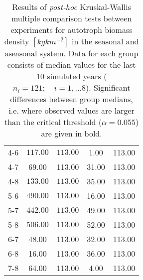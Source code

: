 \begin{table}[ht]
\begin{tabular*}{\textwidth}{@{\extracolsep{\fill} }ccccc}
  4-6 & \(\mathbf{117.00}\) & \(\mathbf{113.00}\) & 1.00 & 113.00 \\ 
  4-7 & 69.00 & 113.00 & 31.00 & 113.00 \\ 
  4-8 & \(\mathbf{133.00}\) & \(\mathbf{113.00}\) & 35.00 & 113.00 \\ 
   [1ex]5-6 & \(\mathbf{490.00}\) & \(\mathbf{113.00}\) & 16.00 & 113.00 \\ 
  5-7 & \(\mathbf{442.00}\) & \(\mathbf{113.00}\) & 49.00 & 113.00 \\ 
  5-8 & \(\mathbf{506.00}\) & \(\mathbf{113.00}\) & 52.00 & 113.00 \\ 
   [1ex]6-7 & 48.00 & 113.00 & 32.00 & 113.00 \\ 
  6-8 & 16.00 & 113.00 & 36.00 & 113.00 \\ 
   [1ex]7-8 & 64.00 & 113.00 & 4.00 & 113.00 \\ 
   \bottomrule
\end{tabular*}
\caption[Kruskal-Wallis multiple comparison of autotroph biomass density.]{Results of \textit{post-hoc} Kruskal-Wallis multiple comparison
                tests between experiments for autotroph biomass density $[kgkm^{-2}]$ in the seasonal and aseasonal system. 
                  Data for each group consists of median values for the last 10 simulated years ($n_{i} = 121; \quad i = 1,\ldots8$). 
                  Significant differences between group medians, i.e. where observed 
                values are larger than the critical threshold ($\alpha = 0.055$) are given in bold.} 
\label{tab:chap:res:dyn:herbIND}
\end{table}
